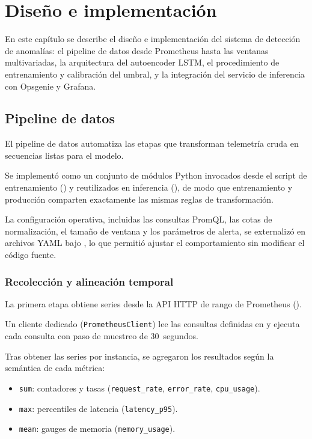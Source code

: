 \chapter{Diseño e implementación}
\label{Chapter3}
\begingroup\sloppy\setlength{\emergencystretch}{2.5em}

En este capítulo se describe el diseño e implementación del sistema de detección de anomalías: el pipeline de datos desde Prometheus hasta las ventanas multivariadas, la arquitectura del autoencoder LSTM, el procedimiento de entrenamiento y calibración del umbral, y la integración del servicio de inferencia con Opsgenie y Grafana.

\section{Pipeline de datos}
\label{sec:pipeline-datos}

El pipeline de datos automatiza las etapas que transforman telemetría cruda en secuencias listas para el modelo. 

Se implementó como un conjunto de módulos Python invocados desde el script de entrenamiento () y reutilizados en inferencia (), de modo que entrenamiento y producción comparten exactamente las mismas reglas de transformación.

La configuración operativa, incluidas las consultas PromQL, las cotas de normalización, el tamaño de ventana y los parámetros de alerta, se externalizó en archivos YAML bajo , lo que permitió ajustar el comportamiento sin modificar el código fuente.

\subsection{Recolección y alineación temporal}

La primera etapa obtiene series desde la API HTTP de rango de Prometheus ().

Un cliente dedicado (\texttt{PrometheusClient}) lee las consultas definidas en  y ejecuta cada consulta con paso de muestreo de 30~segundos.

Tras obtener las series por instancia, se agregaron los resultados según la semántica de cada métrica:

\begin{itemize}
\item \texttt{sum}: contadores y tasas (\texttt{request\_rate}, \texttt{error\_rate}, \texttt{cpu\_usage}).
\item \texttt{max}: percentiles de latencia (\texttt{latency\_p95}).
\item \texttt{mean}: gauges de memoria (\texttt{memory\_usage}).
\end{itemize}

